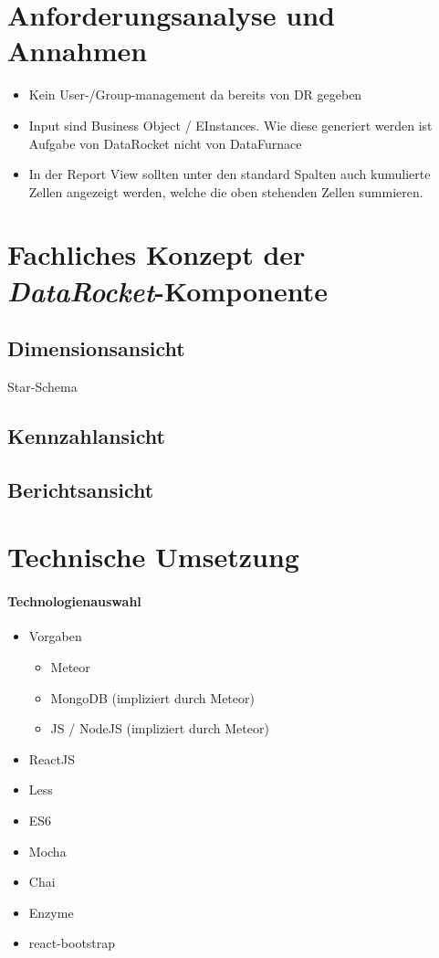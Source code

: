 \documentclass[
  language=german, %
  type=bachelor%
]{isthesis}
\begin{document}
\begin{content}
  \section{Anforderungsanalyse und Annahmen}
  \begin{itemize}
    \item Kein User-/Group-management da bereits von DR gegeben
    \item Input sind Business Object / EInstances. Wie diese generiert werden
      ist Aufgabe von DataRocket nicht von DataFurnace
    \item In der Report View sollten unter den standard Spalten auch kumulierte
      Zellen angezeigt werden, welche die oben stehenden Zellen summieren.
  \end{itemize}

  \section{Fachliches Konzept der \textit{DataRocket}-Komponente}
  \subsection{Dimensionsansicht}
  Star-Schema
  \subsection{Kennzahlansicht}
  \subsection{Berichtsansicht}


  \section{Technische Umsetzung}

  \paragraph{Technologienauswahl}
  \begin{itemize}
    \item Vorgaben
      \begin{itemize}
        \item Meteor
        \item MongoDB (impliziert durch Meteor)
        \item JS / NodeJS (impliziert durch Meteor)
      \end{itemize}
    \item ReactJS
    \item Less
    \item ES6
    \item Mocha
    \item Chai
    \item Enzyme
    \item react-bootstrap
  \end{itemize}


\end{content}
\end{document}
